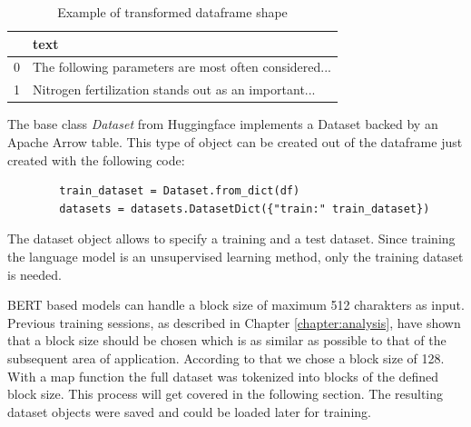 \begin{table}[H]
	\centering
	\begin{tabular}{ll}
		\hline
		& \textbf{text}                                         \\ \hline
		0 & The following parameters are most often considered... \\ \hline
		1 & Nitrogen fertilization stands out as an important...  \\ \hline
	\end{tabular}
	\caption{Example of transformed dataframe shape}
	\label{tab:format}
\end{table}

The base class \textit{Dataset} from Huggingface implements a Dataset backed by an Apache Arrow table. This type of object can be created out of the dataframe just created with the following code:

\begin{code}
	\label{code:cel}
\begin{verbatim}
		train_dataset = Dataset.from_dict(df)
		datasets = datasets.DatasetDict({"train:" train_dataset})
\end{verbatim}
\end{code}

The dataset object allows to specify a training and a test dataset. Since training the language model is an unsupervised learning method, only the training dataset is needed. \newline

BERT based models can handle a block size of maximum 512 charakters as input. Previous training sessions, as described in Chapter \ref{chapter:analysis}, have shown that a block size should be chosen which is as similar as possible to that of the subsequent area of application. According to that we chose a block size of 128. With a map function the full dataset was tokenized into blocks of the defined block size. This process will get covered in the following section. The resulting dataset objects were saved and could be loaded later for training. 